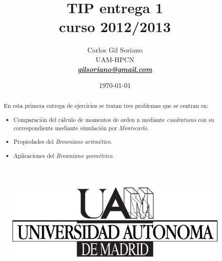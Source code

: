 \documentclass[a4paper,11pt]{article}
\begin{document}

\title{\textbf{{\LARGE TIP entrega 1 \\ curso 2012/2013}}}
\author{Carlos Gil Soriano\\UAM-HPCN\\
\href{mailto:gilsoriano@gmail.com}{\textbf{\textit{gilsoriano@gmail.com}}}}
\date{\today}
\maketitle
\thispagestyle{empty}
\begin{figure}[htb]
   \begin{center}
      \includegraphics[scale=1,
      keepaspectratio]{../../../../../figures/logo/logo-uam.jpg}
   \end{center}
\end{figure}

\begin{abstract}

   En esta primera entrega de ejercicios se tratan tres problemas que se centran
   en:
   \begin{itemize}
      \item Comparaci\'on del c\'alculo de momentos de orden n mediante
         \textit{cuadraturas} con su correspondiente mediante simulaci\'on por
         \textit{Montecarlo}.
      \item Propiedades del \textit{Browniano aritm\'etico}.
      \item Aplicaciones del \textit{Browniano geom\'etrico}.
   \end{itemize}

\end{abstract}
\end{document}
